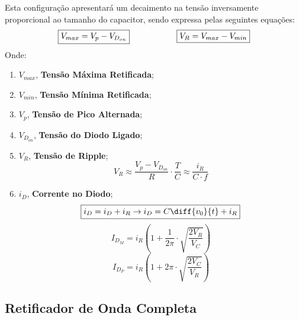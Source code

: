 \documentclass{article}
\begin{document}
            Esta configuração apresentará um decaimento na tensão inversamente proporcional ao tamanho do capacitor, sendo expressa pelas seguintes equações:
                \begin{equation}
                    \boxed{V_{max} = V_{p} - V_{D_{on}}}
                    \hspace{20mm}
                    \boxed{V_{R} = V_{max} - V_{min}}
                \end{equation}
            Onde:
                \begin{enumerate}[noitemsep]
                    \item $V_{max}$, \textbf{Tensão Máxima Retificada};
                    \item $V_{min}$, \textbf{Tensão Mínima Retificada};
                    \item $V_{p}$, \textbf{Tensão de Pico Alternada};
                    \item $V_{D_{on}}$, \textbf{Tensão do Diodo Ligado};
                    \item $V_{R}$, \textbf{Tensão de Ripple};
                        \begin{equation}
                            \boxed{
                                V_{R} \approx \frac{V_{p} - V_{D_{on}}}{R} \cdot \frac{T}{C} \approx \frac{i_{R}}{ C\cdot f}
                            }
                        \end{equation}
                    \item $i_{D}$, \textbf{Corrente no Diodo};
                        \begin{equation}
                            \boxed{
                                i_{D} = i_{D} + i_{R} \to i_{D} = C\diff{v_{0}}{t} + i_{R}
                            }
                        \end{equation}
                        \[
                            I_{D_{M}} = i_{R} \left(1 + \frac{1}{2\pi} \cdot \sqrt{\frac{2V_{R}}{V_{C}}}\right)
                        \]
                        \[
                            I_{D_{P}} = i_{R} \left(1 + 2\pi \cdot \sqrt{\frac{2V_{C}}{V_{R}}}\right)
                        \]
                \end{enumerate}


        \subsection{Retificador de Onda Completa}
\end{document}
